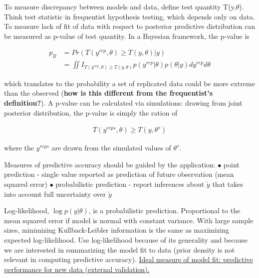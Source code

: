 \documentclass[11pt]{labbook}
\begin{document}

To measure discrepancy between models and data, define test quantity T(y,$\theta$). Think test statistic in frequentist hypothesis testing, which depends only on data. To measure lack of fit of data with respect to posterior predictive distribution can be measured as p-value of test quantity. In a Bayesian framework, the p-value is 

\begin{align*}
p_B &= Pr(T(y^{rep},\theta) \geq T(y,\theta)|y)\\
&= \iint{I_{T(y^{rep},\theta) \geq T(y,\theta)}p(y^{rep}|\theta)p(\theta|y)dy^{rep}d\theta}
\end{align*}

which translates to the probability a set of replicated data could be more extreme than the observed (\textbf{how is this different from the frequentist's definition?}). A p-value can be calculated via simulations: drawing from joint posterior distribution, the p-value is simply the ration of

\begin{align*}
T(y^{rep s},\theta) \geq T(y,\theta^s)
\end{align*}

where the $y^{rep s}$ are drawn from the simulated values of $\theta^s$.


Measures of predictive accuracy should be guided by the application:
$\bullet$ point prediction - single value reported as prediction of future observation (mean squared error)
\newline
$\bullet$ probabilistic prediction - report inferences about $\tilde{y}$ that takes into account full uncertainty over $\tilde{y}$
\newline

Log-likelihood, $\log{p(y|\theta)}$, is a probabilistic prediction. Proportional to the mean squared error if model is normal with constant variance. With large sample sizes, minimizing Kullback-Leibler information is the same as maximizing expected log-likelihood. Use log-likelihood because of its generality and because we are interested in summarizing the model fit to data (prior density is not relevant in computing predictive accuracy). 
\newline
\newline
\underline{Ideal measure of model fit: predictive performance for new data (external validation).} 
\newline
\end{document}
